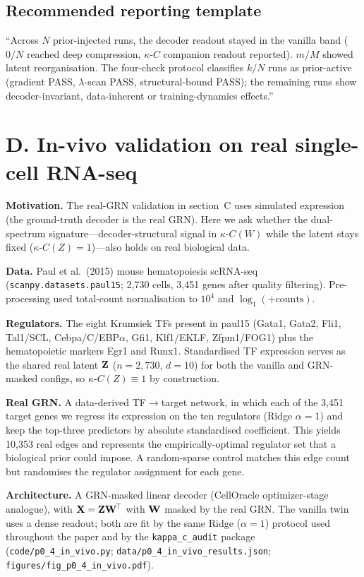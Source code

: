 \documentclass[11 pt,a4 paper]{article}
\begin{document}
\subsection*{Recommended reporting template}
``Across $N$ prior-injected runs, the decoder readout stayed in the vanilla band
($0/N$ reached deep compression, $\kappa$-$C$ companion readout reported). $m/M$ showed latent
reorganisation. The four-check protocol classifies $k/N$ runs as prior-active
(gradient PASS, $\lambda$-scan PASS, structural-bound PASS); the remaining
runs show decoder-invariant, data-inherent or training-dynamics effects.''

\clearpage
\section*{D. In-vivo validation on real single-cell RNA-seq}

\textbf{Motivation.} The real-GRN validation in section~C uses
simulated expression (the ground-truth decoder is the real GRN). Here we ask
whether the dual-spectrum signature---decoder-structural signal in
$\kappa$-$C(W)$ while the latent stays fixed ($\kappa$-$C(Z)=1$)---also holds on
real biological data.

\textbf{Data.} Paul et al.\ (2015) mouse hematopoiesis scRNA-seq
(\texttt{scanpy.datasets.paul15}; 2,730 cells, 3,451 genes after quality
filtering). Pre-processing used total-count normalisation to $10^4$ and
$\log_1(+
\mathrm{counts})$.

\textbf{Regulators.} The eight Krumsiek TFs present in paul15 (Gata1, Gata2,
Fli1, Tal1/SCL, Cebpa/C/EBP$\alpha$, Gfi1, Klf1/EKLF, Zfpm1/FOG1) plus the
hematopoietic markers Egr1 and Runx1. Standardised TF expression serves as the
shared real latent $\mathbf{Z}$ ($n=2,730$, $d=10$) for both the vanilla and GRN-masked
configs, so $\kappa$-$C(Z)\equiv1$ by construction.

\textbf{Real GRN.} A data-derived TF$\to$target network, in which each of the 3,451
target genes we regress its expression on the ten regulators (Ridge $\alpha=1$)
and keep the top-three predictors by absolute standardised coefficient. This
yields 10,353 real edges and represents the empirically-optimal regulator set
that a biological prior could impose. A random-sparse control matches this edge
count but randomises the regulator assignment for each gene.

\textbf{Architecture.} A GRN-masked linear decoder (CellOracle optimizer-stage
analogue), with $\mathbf{X}=\mathbf{Z}\mathbf{W}^{\!\top}$ with $\mathbf{W}$ masked by the real GRN. The
vanilla twin uses a dense readout; both are fit by the same Ridge ($\alpha=1$)
protocol used throughout the paper and by the \texttt{kappa\_c\_audit} package
(\texttt{code/p0\_4\_in\_vivo.py}; \texttt{data/p0\_4\_in\_vivo\_results.json};
\texttt{figures/fig\_p0\_4\_in\_vivo.pdf}).
\end{document}

